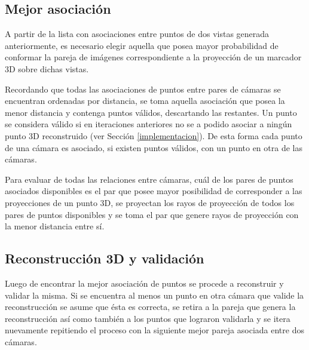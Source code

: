 \subsection{Mejor asociación}\label{MejorAsociacion}

A partir de la lista con asociaciones entre puntos de dos vistas generada anteriormente, es necesario elegir aquella que posea mayor probabilidad de conformar la pareja de imágenes correspondiente a la proyección de un marcador 3D sobre dichas vistas.


Recordando que todas las asociaciones de puntos entre pares de cámaras se encuentran ordenadas por distancia, se toma aquella asociación que posea la menor distancia y contenga puntos válidos, descartando las restantes. Un punto se considera válido si en iteraciones anteriores no se a podido asociar a ningún punto 3D reconstruido (ver Sección \ref{implementacion}).
De esta forma cada punto de una cámara es asociado, si existen puntos válidos, con un punto en otra de las cámaras.

Para evaluar de todas las relaciones entre cámaras, cuál de los pares de puntos asociados disponibles es el par que posee mayor posibilidad de corresponder a las proyecciones de un punto 3D, se proyectan los rayos de proyección de todos los pares de puntos disponibles y se toma el par que genere rayos de proyección con la menor distancia entre sí.

\subsection{Reconstrucción 3D y validación}\label{seccion_reconstruccion3D_validacion}


Luego de encontrar la mejor asociación de puntos se procede a reconstruir y validar la misma. Si se encuentra al menos un punto en otra cámara que valide la reconstrucción se asume que ésta es correcta, se retira a la pareja que genera la reconstrucción así como también a los puntos que lograron validarla y se itera nuevamente repitiendo el proceso con la siguiente mejor pareja asociada entre dos cámaras.  

